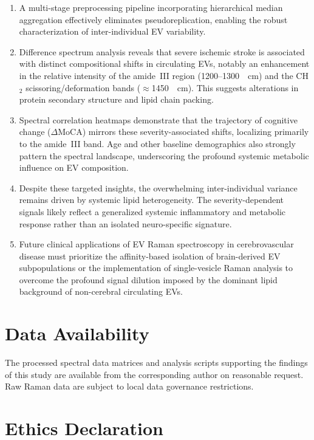 \documentclass[preprint,12pt]{elsarticle}
\begin{document}
\begin{enumerate}
  \item A multi-stage preprocessing pipeline incorporating hierarchical median aggregation effectively eliminates pseudoreplication, enabling the robust characterization of inter-individual EV variability.
  \item Difference spectrum analysis reveals that severe ischemic stroke is associated with distinct compositional shifts in circulating EVs, notably an enhancement in the relative intensity of the amide~III region (1200--1300~\si{\per\centi\metre}) and the CH$_2$ scissoring/deformation bands ($\approx$1450~\si{\per\centi\metre}). This suggests alterations in protein secondary structure and lipid chain packing.
  \item Spectral correlation heatmaps demonstrate that the trajectory of cognitive change ($\Delta$MoCA) mirrors these severity-associated shifts, localizing primarily to the amide~III band. Age and other baseline demographics also strongly pattern the spectral landscape, underscoring the profound systemic metabolic influence on EV composition.
  \item Despite these targeted insights, the overwhelming inter-individual variance remains driven by systemic lipid heterogeneity. The severity-dependent signals likely reflect a generalized systemic inflammatory and metabolic response rather than an isolated neuro-specific signature.
  \item Future clinical applications of EV Raman spectroscopy in cerebrovascular disease must prioritize the affinity-based isolation of brain-derived EV subpopulations or the implementation of single-vesicle Raman analysis to overcome the profound signal dilution imposed by the dominant lipid background of non-cerebral circulating EVs.
\end{enumerate}


\section*{Data Availability}

The processed spectral data matrices and analysis scripts supporting the findings of this study are available from the corresponding author on reasonable request. Raw Raman data are subject to local data governance restrictions.

\section*{Ethics Declaration}
\end{document}
